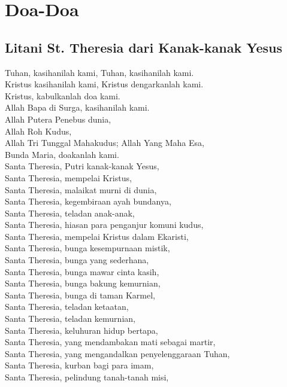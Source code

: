 \chapter{Doa-Doa}

\section{Litani St. Theresia dari Kanak-kanak Yesus}
Tuhan, kasihanilah kami, Tuhan, kasihanilah kami.\\
Kristus kasihanilah kami, Kristus dengarkanlah kami.\\
Kristus, kabulkanlah doa kami.\\
Allah Bapa di Surga, kasihanilah kami.\\
Allah Putera Penebus dunia,\\
Allah Roh Kudus,\\
Allah Tri Tunggal Mahakudus; Allah Yang Maha Esa,\\
Bunda Maria, doakanlah kami.\\
Santa Theresia, Putri kanak-kanak Yesus,\\
Santa Theresia, mempelai Kristus,\\
Santa Theresia, malaikat murni di dunia,\\
Santa Theresia, kegembiraan ayah bundanya,\\
Santa Theresia, teladan anak-anak,\\
Santa Theresia, hiasan para penganjur komuni kudus,\\
Santa Theresia, mempelai Kristus dalam Ekaristi,\\
Santa Theresia, bunga kesempurnaan mistik,\\
Santa Theresia, bunga yang sederhana,\\
Santa Theresia, bunga mawar cinta kasih,\\
Santa Theresia, bunga bakung kemurnian,\\
Santa Theresia, bunga di taman Karmel,\\
Santa Theresia, teladan ketaatan,\\
Santa Theresia, teladan kemurnian,\\
Santa Theresia, keluhuran hidup bertapa,\\
Santa Theresia, yang  mendambakan  mati sebagai martir,\\
Santa Theresia, yang mengandalkan  penyelenggaraan  Tuhan,\\
Santa Theresia, kurban bagi para imam,\\
Santa Theresia, pelindung tanah-tanah misi,\\
